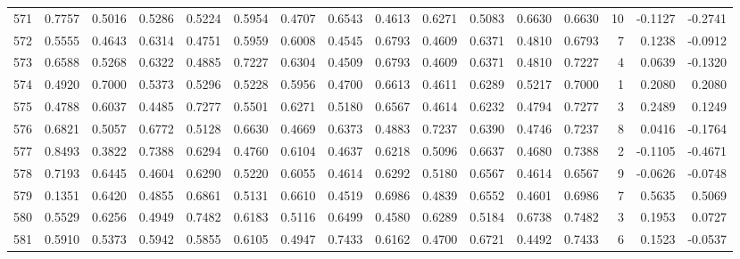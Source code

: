 \begin{tabular}{lrrrrrrrrrrrrrrr}
571 &      0.7757 &  0.5016 &  0.5286 &  0.5224 &  0.5954 &  0.4707 &  0.6543 &  0.4613 &  0.6271 &  0.5083 &   0.6630 &     0.6630 &     10 &                   -0.1127 &                    -0.2741 \\
572 &      0.5555 &  0.4643 &  0.6314 &  0.4751 &  0.5959 &  0.6008 &  0.4545 &  0.6793 &  0.4609 &  0.6371 &   0.4810 &     0.6793 &      7 &                    0.1238 &                    -0.0912 \\
573 &      0.6588 &  0.5268 &  0.6322 &  0.4885 &  0.7227 &  0.6304 &  0.4509 &  0.6793 &  0.4609 &  0.6371 &   0.4810 &     0.7227 &      4 &                    0.0639 &                    -0.1320 \\
574 &      0.4920 &  0.7000 &  0.5373 &  0.5296 &  0.5228 &  0.5956 &  0.4700 &  0.6613 &  0.4611 &  0.6289 &   0.5217 &     0.7000 &      1 &                    0.2080 &                     0.2080 \\
575 &      0.4788 &  0.6037 &  0.4485 &  0.7277 &  0.5501 &  0.6271 &  0.5180 &  0.6567 &  0.4614 &  0.6232 &   0.4794 &     0.7277 &      3 &                    0.2489 &                     0.1249 \\
576 &      0.6821 &  0.5057 &  0.6772 &  0.5128 &  0.6630 &  0.4669 &  0.6373 &  0.4883 &  0.7237 &  0.6390 &   0.4746 &     0.7237 &      8 &                    0.0416 &                    -0.1764 \\
577 &      0.8493 &  0.3822 &  0.7388 &  0.6294 &  0.4760 &  0.6104 &  0.4637 &  0.6218 &  0.5096 &  0.6637 &   0.4680 &     0.7388 &      2 &                   -0.1105 &                    -0.4671 \\
578 &      0.7193 &  0.6445 &  0.4604 &  0.6290 &  0.5220 &  0.6055 &  0.4614 &  0.6292 &  0.5180 &  0.6567 &   0.4614 &     0.6567 &      9 &                   -0.0626 &                    -0.0748 \\
579 &      0.1351 &  0.6420 &  0.4855 &  0.6861 &  0.5131 &  0.6610 &  0.4519 &  0.6986 &  0.4839 &  0.6552 &   0.4601 &     0.6986 &      7 &                    0.5635 &                     0.5069 \\
580 &      0.5529 &  0.6256 &  0.4949 &  0.7482 &  0.6183 &  0.5116 &  0.6499 &  0.4580 &  0.6289 &  0.5184 &   0.6738 &     0.7482 &      3 &                    0.1953 &                     0.0727 \\
581 &      0.5910 &  0.5373 &  0.5942 &  0.5855 &  0.6105 &  0.4947 &  0.7433 &  0.6162 &  0.4700 &  0.6721 &   0.4492 &     0.7433 &      6 &                    0.1523 &                    -0.0537 \\

\end{tabular}

